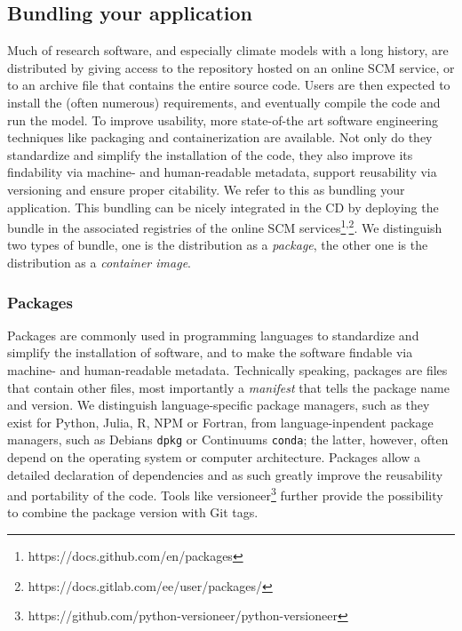 \documentclass[preprint,11pt,5p]{elsarticle}
\begin{document}
\subsection{Bundling your application}\label{bundling-your-application}

Much of research software, and especially climate models with a long
history, are distributed by giving access to the repository hosted on an
online SCM service, or to an archive file that contains the entire
source code. Users are then expected to install the (often numerous)
requirements, and eventually compile the code and run the model. To
improve usability, more state-of-the art software engineering techniques
like packaging and containerization are available. Not only do they
standardize and simplify the installation of the code, they also improve
its findability via machine- and human-readable metadata, support
reusability via versioning and ensure proper citability. We refer to
this as bundling your application. This bundling can be nicely
integrated in the CD by deploying the bundle in the associated
registries of the online SCM
services\footnote{https://docs.github.com/en/packages}\textsuperscript{,}\footnote{https://docs.gitlab.com/ee/user/packages/}.
We distinguish two types of bundle, one is the distribution as a
\emph{package}, the other one is the distribution as a \emph{container
image}.

\subsubsection{Packages}\label{packages}

Packages are commonly used in programming languages to standardize and
simplify the installation of software, and to make the software findable
via machine- and human-readable metadata. Technically speaking, packages
are files that contain other files, most importantly a \emph{manifest}
that tells the package name and version. We distinguish
language-specific package managers, such as they exist for Python,
Julia, R, NPM or Fortran, from language-inpendent package managers, such
as Debians \texttt{dpkg} or Continuums \texttt{conda}; the latter,
however, often depend on the operating system or computer architecture.
Packages allow a detailed declaration of dependencies and as such
greatly improve the reusability and portability of the code. Tools like
versioneer\footnote{https://github.com/python-versioneer/python-versioneer}
further provide the possibility to combine the package version with Git
tags.
\end{document}
